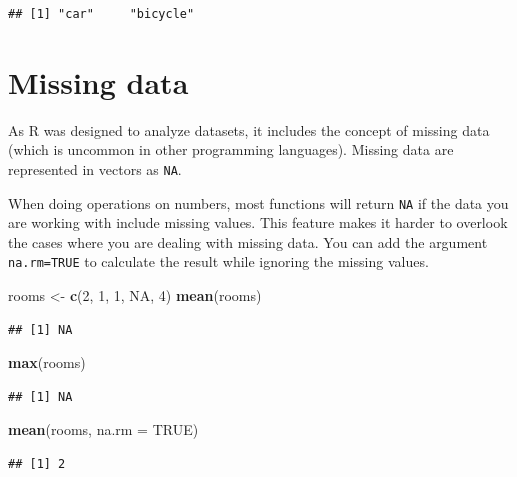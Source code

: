 \documentclass[]{book}
\newenvironment{Shaded}{\begin{snugshade}}{\end{snugshade}}
\newcommand{\KeywordTok}[1]{\textcolor[rgb]{0.13,0.29,0.53}{\textbf{#1}}}
\newcommand{\DataTypeTok}[1]{\textcolor[rgb]{0.13,0.29,0.53}{#1}}
\newcommand{\DecValTok}[1]{\textcolor[rgb]{0.00,0.00,0.81}{#1}}
\newcommand{\StringTok}[1]{\textcolor[rgb]{0.31,0.60,0.02}{#1}}
\newcommand{\OtherTok}[1]{\textcolor[rgb]{0.56,0.35,0.01}{#1}}
\newcommand{\NormalTok}[1]{#1}
\begin{document}
\begin{verbatim}
## [1] "car"     "bicycle"
\end{verbatim}

\section{Missing data}\label{missing-data}

As R was designed to analyze datasets, it includes the concept of
missing data (which is uncommon in other programming languages). Missing
data are represented in vectors as \texttt{NA}.

When doing operations on numbers, most functions will return \texttt{NA}
if the data you are working with include missing values. This feature
makes it harder to overlook the cases where you are dealing with missing
data. You can add the argument \texttt{na.rm=TRUE} to calculate the
result while ignoring the missing values.

\begin{Shaded}
\begin{Highlighting}[]
\NormalTok{rooms <-}\StringTok{ }\KeywordTok{c}\NormalTok{(}\DecValTok{2}\NormalTok{, }\DecValTok{1}\NormalTok{, }\DecValTok{1}\NormalTok{, }\OtherTok{NA}\NormalTok{, }\DecValTok{4}\NormalTok{)}
\KeywordTok{mean}\NormalTok{(rooms)}
\end{Highlighting}
\end{Shaded}

\begin{verbatim}
## [1] NA
\end{verbatim}

\begin{Shaded}
\begin{Highlighting}[]
\KeywordTok{max}\NormalTok{(rooms)}
\end{Highlighting}
\end{Shaded}

\begin{verbatim}
## [1] NA
\end{verbatim}

\begin{Shaded}
\begin{Highlighting}[]
\KeywordTok{mean}\NormalTok{(rooms, }\DataTypeTok{na.rm =} \OtherTok{TRUE}\NormalTok{)}
\end{Highlighting}
\end{Shaded}

\begin{verbatim}
## [1] 2
\end{verbatim}
\end{document}

